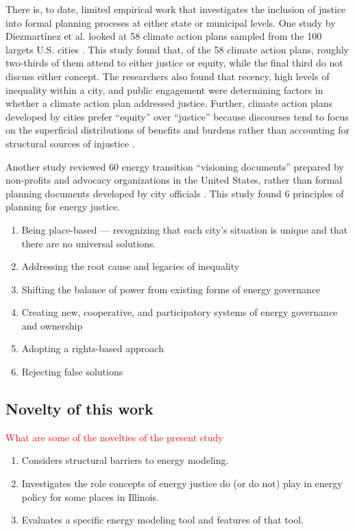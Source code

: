 There is, to date, limited empirical work that investigates the inclusion of
justice into formal planning proceses at either state or municipal levels. One
study by Diezmart\'inez et al. looked at 58 climate action plans sampled from
the 100 largets U.S. cities \cite{diezmartinez_us_2022}. This study found that,
of the 58 climate action plans, roughly two-thirds of them attend to either
justice or equity, while the final third do not discuss either concept. The
researchers also found that recency, high levels of inequality within a city,
and public engagement were determining factors in whether a climate action plan
addressed justice. Further, climate action plans developed by cities prefer
``equity'' over ``justice'' because discourses tend to focus on the superficial
distributions of benefits and burdens rather than accounting for structural
sources of injustice \cite{diezmartinez_us_2022}.

Another study reviewed 60 energy transition ``visioning documents'' prepared by
non-profits and advocacy organizations in the United States, rather than formal
planning documents developed by city officials \cite{elmallah_frontlining_2022}.
This study found 6 principles of planning for energy justice.
\begin{enumerate}
    \item Being place-based --- recognizing that each city's situation is unique
    and that there are no universal solutions.
    \item Addressing the root cause and legacies of inequality
    \item Shifting the balance of power from existing forms of energy governance
    \item Creating new, cooperative, and participatory systems of energy governance and ownership
    \item Adopting a rights-based approach
    \item Rejecting false solutions
\end{enumerate}


\subsection{Novelty of this work}

\textcolor{red}{What are some of the novelties of the present study}
\begin{enumerate}
    \item Considers structural barriers to energy modeling.
    \item Investigates the role concepts of energy justice do (or do not) play
    in energy policy for some places in Illinois.
    \item Evaluates a specific energy modeling tool and features of that tool.
\end{enumerate}
 
